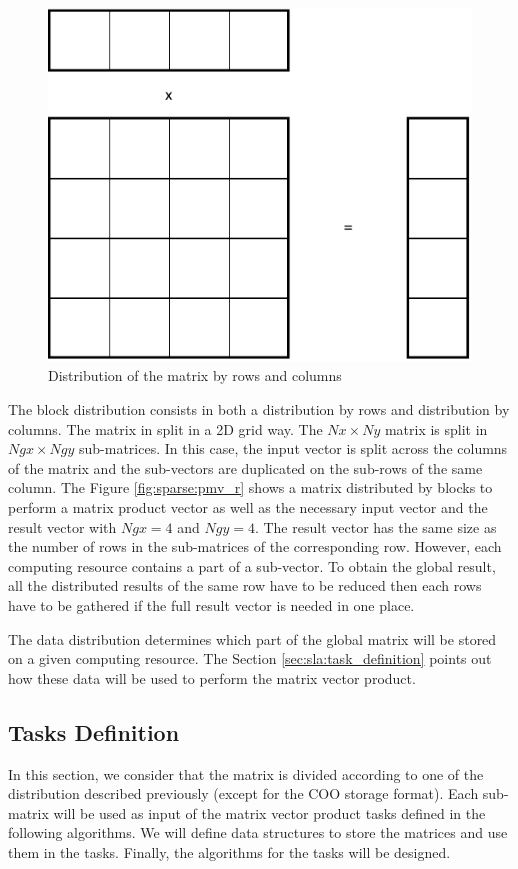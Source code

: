\begin{figure}[h]
	\centering
	\includegraphics[width=.5\textwidth]{pmv_2D}
	\caption{Distribution of the matrix by rows and columns\label{fig:sparse:pmv_2D}}
\end{figure}

The block distribution consists in both a distribution by rows and distribution by columns.
The matrix in split in a 2D grid way.
The $Nx \times Ny$ matrix is split in $Ngx \times Ngy$ sub-matrices.
In this case, the input vector is split across the columns of the matrix and the sub-vectors are duplicated on the sub-rows of the same column.
The Figure \ref{fig:sparse:pmv_r} shows a matrix distributed by blocks to perform a matrix product vector as well as the necessary input vector and the result vector with $Ngx = 4$ and $Ngy = 4$.
The result vector has the same size as the number of rows in the sub-matrices of the corresponding row.
However, each computing resource contains a part of a sub-vector.
To obtain the global result, all the distributed results of the same row have to be reduced then each rows have to be gathered if the full result vector is needed in one place.

The data distribution determines which part of the global matrix will be stored on a given computing resource.
The Section \ref{sec:sla:task_definition} points out how these data will be used to perform the matrix vector product.

\subsection{Tasks Definition \label{sec:sla:task_definition}}

In this section, we consider that the matrix is divided according to one of the distribution described previously (except for the COO storage format).
Each sub-matrix will be used as input of the matrix vector product tasks defined in the following algorithms.
We will define data structures to store the matrices and use them in the tasks.
Finally, the algorithms for the tasks will be designed.


